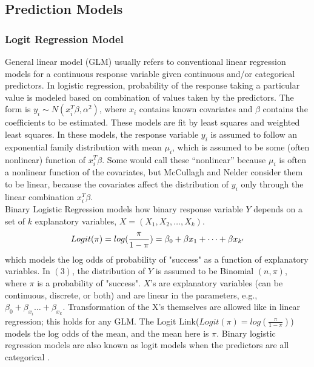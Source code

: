     \subsection{Prediction Models} 
      \subsubsection{Logit Regression Model}
      \noindent General linear model (GLM) \citep{p1982generalized} usually refers to conventional linear regression models for a continuous response variable given continuous and/or categorical predictors. In logistic regression, probability of the response taking a particular value is modeled based on combination of values taken by the predictors. The form is $ y_i\sim N(x_i^T\beta,\alpha^2)$, where $x_i$ contains known covariates and $\beta$ contains the coefficients to be estimated. These models are fit by least squares and weighted least squares. In these models, the response variable $y_i$ is assumed to follow an exponential family distribution with mean $\mu_i$, which is assumed to be some (often nonlinear) function of $x_i^T\beta$. Some would call these “nonlinear” because  $\mu_i$ is often a nonlinear function of the covariates, but McCullagh and Nelder\citep{p1982generalized} consider them to be linear, because the covariates affect the distribution of $y_i$ only through the linear combination $x_i^T\beta$. \\
      [\baselineskip]\indent Binary Logistic Regression models how binary response variable $Y$ depends on a set of $k$ explanatory variables, $X=(X_1, X_2,\dots, X_k)$.\\
      \begin{equation}\label{}
      	Logit(\pi)=log(\frac{\pi}{1-{\pi}})=
      	\beta_0+\beta{x_1}+\dots+
      	\beta{x_{k'}}\\
      \end{equation}
      which models the log odds of probability of "success" as a function of explanatory variables. In $(3)$, the distribution of $Y$ is assumed to be Binomial $(n,\pi)$, where $\pi $ is a probability of "success". $X$'s are explanatory variables (can be continuous, discrete, or both) and are linear in the parameters, e.g., $\beta_0 + \beta_{x_i} \dots +\beta_{x_k}$. Transformation of the X's themselves are allowed like in linear regression; this holds for any GLM. The Logit Link($ Logit(\pi)=log(\frac{\pi}{1-{\pi}})$) models the log odds of the mean, and the mean here is $\pi$. Binary logistic regression models are also known as logit models when the predictors are all categorical \citep{p1982generalized} .\\
    
